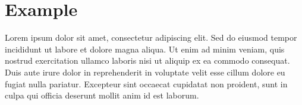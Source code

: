 \section{Example}
Lorem ipsum dolor sit amet, consectetur adipiscing elit. Sed do eiusmod tempor incididunt ut labore et dolore magna aliqua. Ut enim ad minim veniam, quis nostrud exercitation ullamco laboris nisi ut aliquip ex ea commodo consequat. Duis aute irure dolor in reprehenderit in voluptate velit esse cillum dolore eu fugiat nulla pariatur. Excepteur sint occaecat cupidatat non proident, sunt in culpa qui officia deserunt mollit anim id est laborum.
